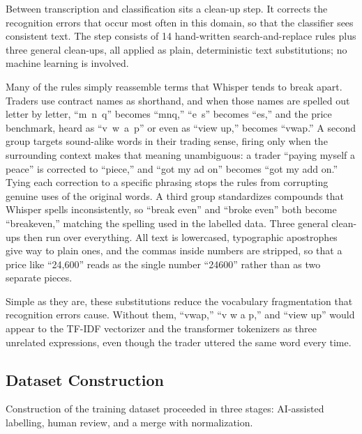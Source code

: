 Between transcription and classification sits a clean-up step. It corrects the recognition errors that occur most often in this domain, so that the classifier sees consistent text. The step consists of 14 hand-written search-and-replace rules plus three general clean-ups, all applied as plain, deterministic text substitutions; no machine learning is involved.

Many of the rules simply reassemble terms that Whisper tends to break apart. Traders use contract names as shorthand, and when those names are spelled out letter by letter, ``m~n~q'' becomes ``mnq,'' ``e~s'' becomes ``es,'' and the price benchmark, heard as ``v~w~a~p'' or even as ``view up,'' becomes ``vwap.'' A second group targets sound-alike words in their trading sense, firing only when the surrounding context makes that meaning unambiguous: a trader ``paying myself a peace'' is corrected to ``piece,'' and ``got my ad on'' becomes ``got my add on.'' Tying each correction to a specific phrasing stops the rules from corrupting genuine uses of the original words. A third group standardizes compounds that Whisper spells inconsistently, so ``break even'' and ``broke even'' both become ``breakeven,'' matching the spelling used in the labelled data. Three general clean-ups then run over everything. All text is lowercased, typographic apostrophes give way to plain ones, and the commas inside numbers are stripped, so that a price like ``24,600'' reads as the single number ``24600'' rather than as two separate pieces.

Simple as they are, these substitutions reduce the vocabulary fragmentation that recognition errors cause. Without them, ``vwap,'' ``v w a p,'' and ``view up'' would appear to the TF-IDF vectorizer and the transformer tokenizers as three unrelated expressions, even though the trader uttered the same word every time.

\subsection{Dataset Construction}
\label{sec:dataset_construction}

Construction of the training dataset proceeded in three stages: AI-assisted labelling, human review, and a merge with normalization.


